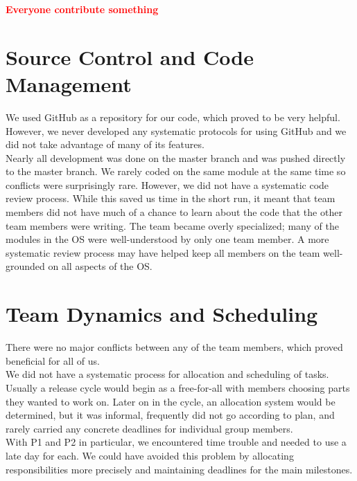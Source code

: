 \documentclass[12pt]{report}
\begin{document}
\textcolor{red}{\textbf{Everyone contribute something}} \\

\section{Source Control and Code Management}

We used GitHub as a repository for our code, which proved to be very helpful. However, we never developed any systematic protocols for using GitHub and we did not take advantage of many of its features.\\

Nearly all development was done on the master branch and was pushed directly to the master branch. We rarely coded on the same module at the same time so conflicts were surprisingly rare. However, we did not have a systematic code review process. While this saved us time in the short run, it meant that team members did not have much of a chance to learn about the code that the other team members were writing. The team became overly specialized; many of the modules in the OS were well-understood by only one team member. A more systematic review process may have helped keep all members on the team well-grounded on all aspects of the OS.\\

\section{Team Dynamics and Scheduling}

There were no major conflicts between any of the team members, which proved beneficial for all of us.\\

We did not have a systematic process for allocation and scheduling of tasks. Usually a release cycle would begin as a free-for-all with members choosing parts they wanted to work on. Later on in the cycle, an allocation system would be determined, but it was informal, frequently did not go according to plan, and rarely carried any concrete deadlines for individual group members.\\

With P1 and P2 in particular, we encountered time trouble and needed to use a late day for each. We could have avoided this problem by allocating responsibilities more precisely and maintaining deadlines for the main milestones.\\
\end{document}
